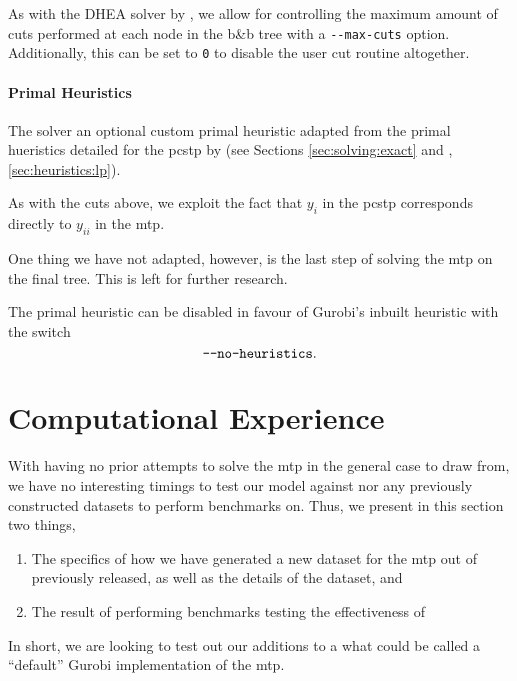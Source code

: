 As with the DHEA solver by \citet{ljubic2005solving}, we allow for controlling the maximum amount
of cuts performed at each node in the b\&b tree
with a \texttt{-{}-max-cuts} option. Additionally, this can be set
to \texttt{0} to disable the user cut routine altogether.

\paragraph{Primal Heuristics}
The solver an optional custom primal heuristic adapted from the primal hueristics detailed
for the \gls{pcstp} by \citet{ljubic2005solving}
(see Sections \ref{sec:solving:exact} and , \ref{sec:heuristics:lp}).

As with the cuts above, we exploit the fact that $y_i$ in the \gls{pcstp}
corresponds directly to $y_{ii}$ in the \gls{mtp}.

One thing we have not adapted, however, is the last step of solving the \gls{mtp}
on the final tree. This is left for further research.

The primal heuristic can be disabled in favour of Gurobi's inbuilt heuristic with
the switch \[\texttt{-{}-no-heuristics}\mathnormal{.}\]
\section{Computational Experience}
With having no prior attempts to solve the \gls{mtp} in the general case to draw from,
we have no interesting timings to test our model against nor any previously constructed
datasets to perform benchmarks on. Thus, we present in this section two things,
\begin{enumerate}
\item The specifics of how we have generated a new dataset for the \gls{mtp} out of previously released,
  as well as the details of the dataset, and
\item The result of performing benchmarks testing the effectiveness of
\end{enumerate}
In short, we are looking to test out our additions to a what could be called a ``default'' Gurobi
implementation of the \gls{mtp}.

